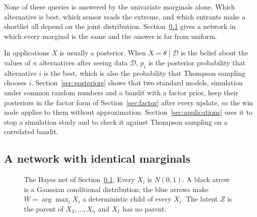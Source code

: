 \documentclass[11pt]{article}
\begin{document}
None of these queries is answered by the univariate marginals alone.
Which alternative is best, which sensor reads the extreme, and which
entrants make a shortlist all depend on the joint distribution.
Section~\ref{sec:examples} gives a network in which every marginal is
the same and the answer is far from uniform.

In applications $X$ is usually a posterior. When
$X=\theta\mid\mathcal{D}$ is the belief about the values of $n$
alternatives after seeing data $\mathcal{D}$, $p_i$ is the posterior
probability that alternative $i$ is the best, which is also the
probability that Thompson sampling chooses $i$.
Section~\ref{sec:posteriors} shows that two standard models,
simulation under common random numbers and a bandit with a factor
prior, keep their posteriors in the factor form of
Section~\ref{sec:factor} after every update, so the win node applies
to them without approximation.
Section~\ref{sec:applications} uses it to stop a simulation study and
to check it against Thompson sampling on a correlated bandit.

\subsection{A network with identical marginals}
\label{sec:examples}

\begin{figure}[h]
\centering
{}
\caption{The Bayes net of Section~\ref{sec:examples}. Every $X_i$ is
$N(0,1)$. A black arrow is a Gaussian conditional distribution; the
blue arrows make $W=\arg\max_i X_i$ a deterministic child of every
$X_i$. The latent $Z$ is the parent of $X_2,\dots,X_n$ and $X_1$ has
no parent.}
\label{fig:nets}
\end{figure}
\end{document}
